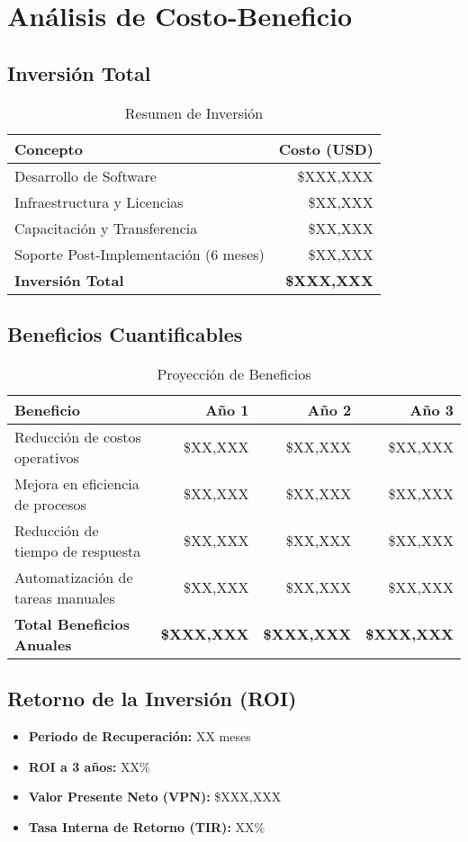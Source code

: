 \section{Análisis de Costo-Beneficio}

\subsection{Inversión Total}
\begin{table}[h!]
\centering
\begin{tabular}{|l|r|}
\hline
\textbf{Concepto} & \textbf{Costo (USD)} \\
\hline
Desarrollo de Software & \$XXX,XXX \\
Infraestructura y Licencias & \$XX,XXX \\
Capacitación y Transferencia & \$XX,XXX \\
Soporte Post-Implementación (6 meses) & \$XX,XXX \\
\hline
\textbf{Inversión Total} & \textbf{\$XXX,XXX} \\
\hline
\end{tabular}
\caption{Resumen de Inversión}
\end{table}

\subsection{Beneficios Cuantificables}
\begin{table}[h!]
\centering
\begin{tabular}{|l|r|r|r|}
\hline
\textbf{Beneficio} & \textbf{Año 1} & \textbf{Año 2} & \textbf{Año 3} \\
\hline
Reducción de costos operativos & \$XX,XXX & \$XX,XXX & \$XX,XXX \\
Mejora en eficiencia de procesos & \$XX,XXX & \$XX,XXX & \$XX,XXX \\
Reducción de tiempo de respuesta & \$XX,XXX & \$XX,XXX & \$XX,XXX \\
Automatización de tareas manuales & \$XX,XXX & \$XX,XXX & \$XX,XXX \\
\hline
\textbf{Total Beneficios Anuales} & \textbf{\$XXX,XXX} & \textbf{\$XXX,XXX} & \textbf{\$XXX,XXX} \\
\hline
\end{tabular}
\caption{Proyección de Beneficios}
\end{table}

\subsection{Retorno de la Inversión (ROI)}
\begin{itemize}
    \item \textbf{Periodo de Recuperación:} XX meses
    \item \textbf{ROI a 3 años:} XX\%
    \item \textbf{Valor Presente Neto (VPN):} \$XXX,XXX
    \item \textbf{Tasa Interna de Retorno (TIR):} XX\%
\end{itemize}

